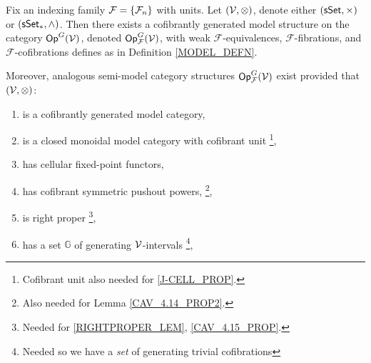 \documentclass[a4paper,10pt
,draft
]{article}%
\renewcommand{\F}{\mathcal F}
\renewcommand{\1}{\ensuremath{\mathbb{id}}}
\begin{document}
\begin{theorem}
      \label{MODEL_THM}
      Fix an indexing family $\F = \set{\F_n}$ with units.
      Let $(\mathcal V, \otimes)$, denote either $(\mathsf{sSet}, \times)$ or $(\sSet_{\**}, \wedge)$.
      Then there exists a cofibrantly generated model structure on the category $\mathsf{Op}^G(\mathcal V)$,
      denoted $\Op^G_\F(\V)$, with
      weak $\F$-equivalences, $\F$-fibrations, and $\F$-cofibrations defines as in Definition \ref{MODEL_DEFN}.
           
      Moreover, analogous semi-model category structures $\Op^G_\F(\V)$ exist
      provided that $(\mathcal V, \otimes)$:
      \begin{enumerate}[label = (\roman*)]\itemsep-4pt
      \item is a cofibrantly generated model category,
      \item is a closed monoidal model category with cofibrant unit
            \footnote{Cofibrant unit also needed for \ref{J-CELL_PROP}.},
      \item has cellular fixed-point functors,
      \item \label{CSPP_LBL} has cofibrant symmetric pushout powers,
            \footnote{Also needed for Lemma \ref{CAV_4.14_PROP2}.},            
      \item \label{RP_LBL} is right proper
            \footnote{Needed for \ref{RIGHTPROPER_LEM}, \ref{CAV_4.15_PROP}.},
      \item \label{GENSET_LBL} has a set $\mathbb{G}$ of generating $\mathcal V$-intervals
            \footnote{Needed so we have a \textit{set} of generating trivial cofibrations},
      \end{enumerate}
\end{theorem}
\end{document}
